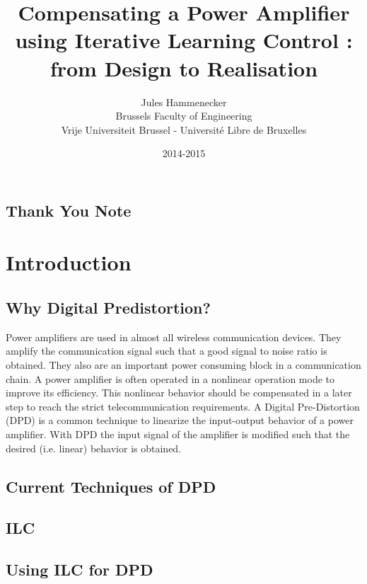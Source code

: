 \documentclass[a4paper]{report}
\begin{document}
\title{Compensating a Power Amplifier using Iterative Learning Control : from Design to Realisation  }

\author{Jules Hammenecker \\ Brussels Faculty of Engineering \\ Vrije Universiteit Brussel - Universit\'e Libre de Bruxelles}
\date{2014-2015 }

\maketitle
\section*{Thank You Note}

\begin{abstract}
	
\end{abstract}

\tableofcontents
\chapter{Introduction}
	\section{Why Digital Predistortion?}
	Power amplifiers are used in almost all wireless communication devices. They amplify the communication signal such that a good signal to noise ratio is obtained. They also are an important power consuming block in a communication chain. A power amplifier is often operated in a nonlinear operation mode to improve its efficiency. This nonlinear behavior should be compensated in a later step to reach the strict telecommunication requirements.
	A Digital Pre-Distortion (DPD) is a common technique to linearize the input-output behavior of a power amplifier. With DPD the input signal of the amplifier is modified such that the desired (i.e. linear) behavior is obtained. 

	\section{Current Techniques of DPD}
	\section{ILC}
	\section{Using ILC for DPD}
\end{document}

